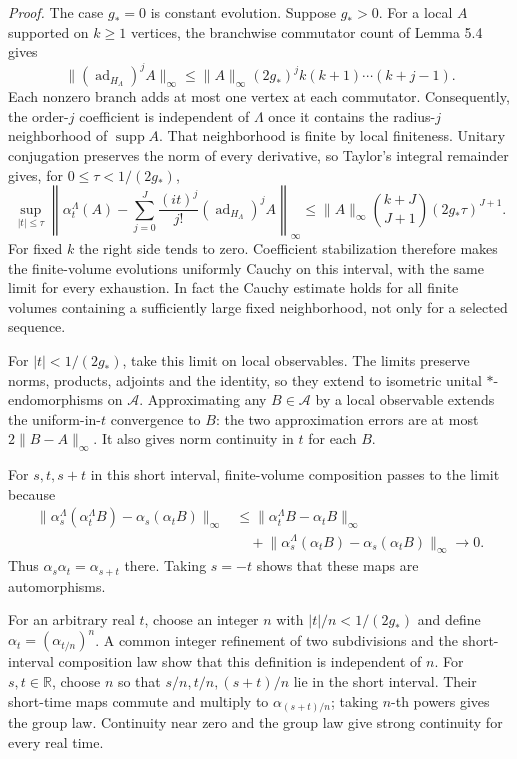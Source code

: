 \documentclass[
  11pt,
]{article}
\begin{document}
\emph{Proof.} The case \(g_*=0\) is constant evolution. Suppose \(g_*>0\).
For a local \(A\) supported on \(k\geq1\) vertices, the branchwise
commutator count of Lemma 5.4 gives
\[
 \lVert (\operatorname{ad}_{H_\Lambda})^j A\rVert_\infty
 \leq \lVert A\rVert_\infty(2g_*)^j k(k+1)\cdots(k+j-1).
\]
Each nonzero branch adds at most one vertex at each commutator.
Consequently, the order-\(j\) coefficient is independent of
\(\Lambda\) once it contains the radius-\(j\) neighborhood of
\(\operatorname{supp}A\). That neighborhood is finite by local
finiteness. Unitary conjugation preserves the norm of every derivative,
so Taylor's integral remainder gives, for \(0\leq\tau<1/(2g_*)\),
\[
 \sup_{|t|\leq\tau}
 \left\lVert\alpha_t^\Lambda(A)-
 \sum_{j=0}^{J}\frac{(it)^j}{j!}
       (\operatorname{ad}_{H_\Lambda})^j A\right\rVert_\infty
 \leq \lVert A\rVert_\infty {k+J\choose J+1}(2g_*\tau)^{J+1}.                 \tag{5.10a}
\]
For fixed \(k\) the right side tends to zero. Coefficient stabilization
therefore makes the finite-volume evolutions uniformly Cauchy on this
interval, with the same limit for every exhaustion. In fact the
Cauchy estimate holds for all finite volumes containing a sufficiently
large fixed neighborhood, not only for a selected sequence.

For \(|t|<1/(2g_*)\), take this limit on local observables. The limits
preserve norms, products, adjoints and the identity, so they extend to
isometric unital \(*\)-endomorphisms on \(\mathcal A\).
Approximating any \(B\in\mathcal A\) by a local observable extends the
uniform-in-\(t\) convergence to \(B\): the two approximation errors
are at most \(2\lVert B-A\rVert_\infty\). It also gives norm continuity in \(t\)
for each \(B\).

For \(s,t,s+t\) in this short interval, finite-volume composition passes
to the limit because
\[
 \begin{aligned}
 \lVert \alpha_s^\Lambda(\alpha_t^\Lambda B)-\alpha_s(\alpha_t B)\rVert_\infty
 &\leq\lVert \alpha_t^\Lambda B-\alpha_t B\rVert_\infty\\
 &\quad+\lVert \alpha_s^\Lambda(\alpha_t B)-\alpha_s(\alpha_t B)\rVert_\infty
 \longrightarrow0 .
 \end{aligned}
\]
Thus \(\alpha_s\alpha_t=\alpha_{s+t}\) there. Taking \(s=-t\)
shows that these maps are automorphisms.

For an arbitrary real \(t\), choose an integer \(n\) with
\(|t|/n<1/(2g_*)\) and define
\(\alpha_t=(\alpha_{t/n})^n\). A common integer refinement of two
subdivisions and the short-interval composition law show that this
definition is independent of \(n\). For \(s,t\in\mathbb R\), choose
\(n\) so that \(s/n,t/n,(s+t)/n\) lie in the short interval. Their
short-time maps commute and multiply to \(\alpha_{(s+t)/n}\);
taking \(n\)-th powers gives the group law. Continuity near zero
and the group law give strong continuity for every real time.
\end{document}
